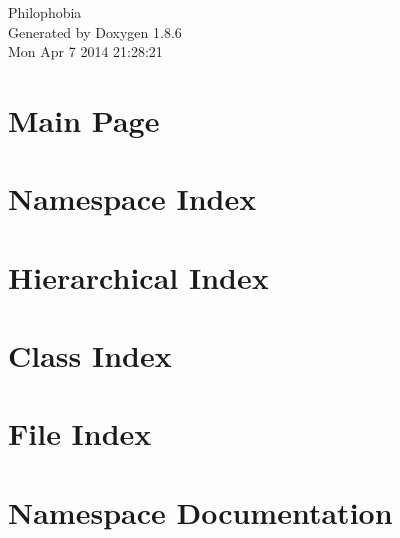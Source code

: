 \documentclass[twoside]{book}
\newcommand{\clearemptydoublepage}{%
  \newpage{\pagestyle{empty}\cleardoublepage}%
}
\begin{document}
\hypersetup{pageanchor=false}
\begin{titlepage}
\vspace*{7cm}
\begin{center}%
{\Large Philophobia }\\
\vspace*{1cm}
{\large Generated by Doxygen 1.8.6}\\
\vspace*{0.5cm}
{\small Mon Apr 7 2014 21:28:21}\\
\end{center}
\end{titlepage}
\clearemptydoublepage
\tableofcontents
\clearemptydoublepage
{}
\hypersetup{pageanchor=true}

\chapter{Main Page}
\label{index}\hypertarget{index}{}
\chapter{Namespace Index}

\chapter{Hierarchical Index}

\chapter{Class Index}

\chapter{File Index}

\chapter{Namespace Documentation}












\end{document}
